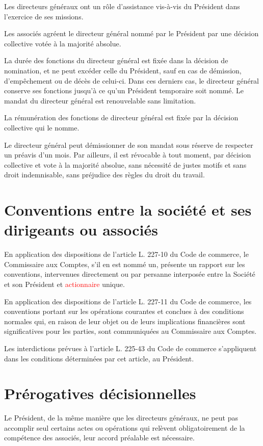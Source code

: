 \documentclass[a4paper,12pt]{report}
\begin{document}
Les directeurs généraux ont un rôle d'assistance vis-à-vis du Président dans l'exercice de ses missions.

Les associés agréent le directeur général nommé par le Président par une décision collective votée à la majorité absolue.

La durée des fonctions du directeur général est fixée dans la décision de nomination, et ne peut excéder celle du Président, sauf en cas de démission, 
d'empêchement ou de décès de celui-ci. 
Dans ces derniers cas, le directeur général conserve ses fonctions jusqu'à ce qu'un Président temporaire soit nommé. 
Le mandat du directeur général est renouvelable sans limitation.

La rémunération des fonctions de directeur général est fixée par la décision collective qui le nomme.

Le directeur général peut démissionner de son mandat sous réserve de respecter un préavis d'un mois. 
Par ailleurs, il est révocable à tout moment, par décision collective et vote à la majorité absolue, 
sans nécessité de justes motifs et sans droit indemnisable, sans préjudice des règles du droit du travail.

\section{Conventions entre la société et ses dirigeants ou associés}
En application des dispositions de l'article L. 227-10 du Code de commerce, le Commissaire aux Comptes, s'il en est nommé un, présente un rapport sur les conventions, 
intervenues directement ou par persanne interposée entre la Société et son Président et \textcolor{red}{actionnaire} unique.

En application des dispositions de l'article L. 227-11 du Code de commerce, les conventions portant sur les opérations courantes et conclues à des conditions normales qui, 
en raison de leur objet ou de leurs implications financières sont significatives pour les parties, sont communiquées au Commissaire aux Comptes.

Les interdictions prévues à l'article L. 225-43 du Code de commerce s'appliquent dans les conditions déterminées par cet article, au Président.

\section{Prérogatives décisionnelles}
Le Président, de la même manière que les directeurs généraux, ne peut pas accomplir seul certains actes ou opérations 
qui relèvent obligatoirement de la compétence des associés, leur accord préalable est nécessaire.
\end{document}

